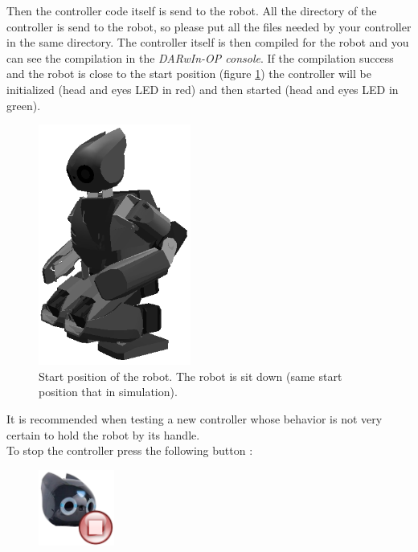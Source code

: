 \documentclass[a4paper, 12pt]{article}  		%
\begin{document}
Then the controller code itself is send to the robot. All the directory of the controller is send to the robot, so please put all the files needed by your controller in the same directory. The controller itself is then compiled for the robot and you can see the compilation in the \textit{DARwIn-OP console}. If the compilation success and the robot is close to the start position (figure \ref{start_position}) the controller will be initialized (head and eyes LED in red) and then started (head and eyes LED in green).\\

\begin{figure}[H]
\begin{center}
\includegraphics[width=5cm]{start_position.png}
\caption{Start position of the robot. The robot is sit down (same start position that in simulation).}
\label{start_position}
\end{center}
\end{figure}

It is recommended when testing a new controller whose behavior is not very certain to hold the robot by its handle.\\

To stop the controller press the following button :
\begin{figure}[H]
\begin{center}
\includegraphics[width=2.5cm]{stop.png}
\label{stop}
\end{center}
\end{figure}
\end{document}
